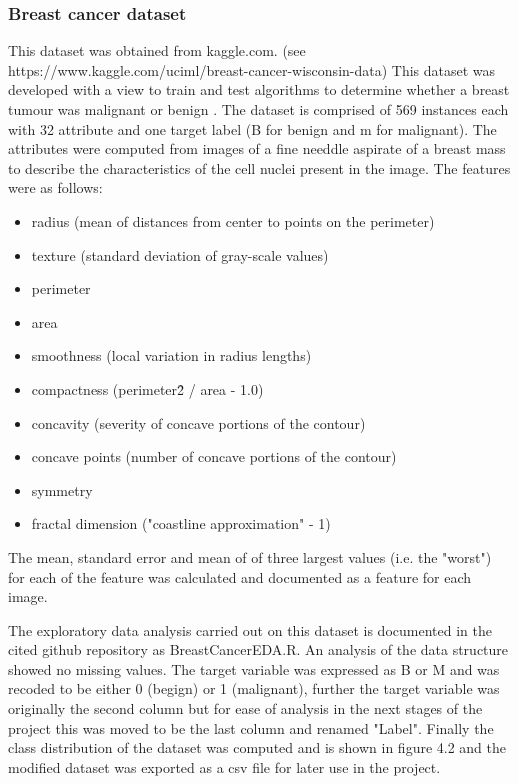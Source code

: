 \subsubsection{Breast cancer dataset}
This dataset was obtained from kaggle.com. \newline
(see https://www.kaggle.com/uciml/breast-cancer-wisconsin-data) \newline
This dataset was developed with a view to train and test algorithms to determine whether a breast tumour was malignant or benign \cite{}. \newline
The dataset is comprised of 569 instances each with 32 attribute and one target label (B for benign and m for malignant).\newline
The attributes were computed from images of a fine needdle aspirate of a breast mass to describe the characteristics of the cell nuclei present in the image. The features were as follows:
\begin{itemize}
    \item radius (mean of distances from center to points on the perimeter)
    \item texture (standard deviation of gray-scale values) 
    \item perimeter 
    \item area 
    \item smoothness (local variation in radius lengths) 
    \item compactness (perimeter\^2 / area - 1.0)
    \item concavity (severity of concave portions of the contour)
    \item concave points (number of concave portions of the contour)
    \item symmetry
    \item fractal dimension ("coastline approximation" - 1)
\end{itemize}
The mean, standard error and mean of of three largest values (i.e. the "worst") for each of the feature was calculated and documented as a feature for each image.\newline

The exploratory data analysis carried out on this dataset is documented in the cited github repository as BreastCancerEDA.R.\newline
An analysis of the data structure showed no missing values. The target variable was expressed as B or M and was recoded to be either 0 (begign) or 1 (malignant), further the target variable was originally the second column but for ease of analysis in the next stages of the project this was moved to be the last column and renamed "Label".
Finally the class distribution of the dataset was computed and is shown in figure 4.2 and the modified dataset was exported as a csv file for later use in the project.

